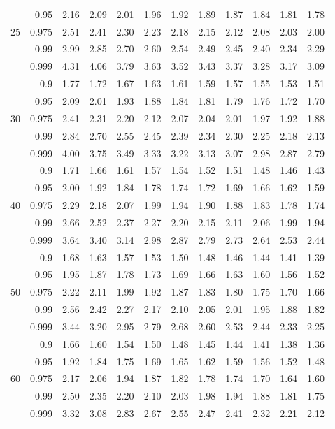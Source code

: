 \documentclass[12pt,a4paper,openany,twoside]{report}
\theoremstyle{definition}
\theoremstyle{remark}
\theoremstyle{plain}
\theoremstyle{definition}
\theoremstyle{definition}
\theoremstyle{definition}
\theoremstyle{remark}
\begin{document}
\begin{center}
\begin{tabular}{rr@{\ \ }r@{\ \ }r@{\ \ }r@{\ \ }r@{\ \ }r@{\ \ }r@{\ \ }r@{\ \ }r@{\ \ }r@{\ \ }r@{ }}
 & 0.95 & 2.16 & 2.09 & 2.01 & 1.96 & 1.92 & 1.89 & 1.87 & 1.84 & 1.81 & 1.78\\
25 & 0.975 & 2.51 & 2.41 & 2.30 & 2.23 & 2.18 & 2.15 & 2.12 & 2.08 & 2.03 & 2.00\\
 & 0.99 & 2.99 & 2.85 & 2.70 & 2.60 & 2.54 & 2.49 & 2.45 & 2.40 & 2.34 & 2.29\\
 & 0.999 & 4.31 & 4.06 & 3.79 & 3.63 & 3.52 & 3.43 & 3.37 & 3.28 & 3.17 & 3.09\\
\rule{0pt}{2.5ex} & 0.9 & 1.77 & 1.72 & 1.67 & 1.63 & 1.61 & 1.59 & 1.57 & 1.55 & 1.53 & 1.51\\
 & 0.95 & 2.09 & 2.01 & 1.93 & 1.88 & 1.84 & 1.81 & 1.79 & 1.76 & 1.72 & 1.70\\
30 & 0.975 & 2.41 & 2.31 & 2.20 & 2.12 & 2.07 & 2.04 & 2.01 & 1.97 & 1.92 & 1.88\\
 & 0.99 & 2.84 & 2.70 & 2.55 & 2.45 & 2.39 & 2.34 & 2.30 & 2.25 & 2.18 & 2.13\\
 & 0.999 & 4.00 & 3.75 & 3.49 & 3.33 & 3.22 & 3.13 & 3.07 & 2.98 & 2.87 & 2.79\\
\rule{0pt}{2.5ex} & 0.9 & 1.71 & 1.66 & 1.61 & 1.57 & 1.54 & 1.52 & 1.51 & 1.48 & 1.46 & 1.43\\
 & 0.95 & 2.00 & 1.92 & 1.84 & 1.78 & 1.74 & 1.72 & 1.69 & 1.66 & 1.62 & 1.59\\
40 & 0.975 & 2.29 & 2.18 & 2.07 & 1.99 & 1.94 & 1.90 & 1.88 & 1.83 & 1.78 & 1.74\\
 & 0.99 & 2.66 & 2.52 & 2.37 & 2.27 & 2.20 & 2.15 & 2.11 & 2.06 & 1.99 & 1.94\\
 & 0.999 & 3.64 & 3.40 & 3.14 & 2.98 & 2.87 & 2.79 & 2.73 & 2.64 & 2.53 & 2.44\\
\rule{0pt}{2.5ex} & 0.9 & 1.68 & 1.63 & 1.57 & 1.53 & 1.50 & 1.48 & 1.46 & 1.44 & 1.41 & 1.39\\
 & 0.95 & 1.95 & 1.87 & 1.78 & 1.73 & 1.69 & 1.66 & 1.63 & 1.60 & 1.56 & 1.52\\
50 & 0.975 & 2.22 & 2.11 & 1.99 & 1.92 & 1.87 & 1.83 & 1.80 & 1.75 & 1.70 & 1.66\\
 & 0.99 & 2.56 & 2.42 & 2.27 & 2.17 & 2.10 & 2.05 & 2.01 & 1.95 & 1.88 & 1.82\\
 & 0.999 & 3.44 & 3.20 & 2.95 & 2.79 & 2.68 & 2.60 & 2.53 & 2.44 & 2.33 & 2.25\\
\rule{0pt}{2.5ex} & 0.9 & 1.66 & 1.60 & 1.54 & 1.50 & 1.48 & 1.45 & 1.44 & 1.41 & 1.38 & 1.36\\
 & 0.95 & 1.92 & 1.84 & 1.75 & 1.69 & 1.65 & 1.62 & 1.59 & 1.56 & 1.52 & 1.48\\
60 & 0.975 & 2.17 & 2.06 & 1.94 & 1.87 & 1.82 & 1.78 & 1.74 & 1.70 & 1.64 & 1.60\\
 & 0.99 & 2.50 & 2.35 & 2.20 & 2.10 & 2.03 & 1.98 & 1.94 & 1.88 & 1.81 & 1.75\\
 & 0.999 & 3.32 & 3.08 & 2.83 & 2.67 & 2.55 & 2.47 & 2.41 & 2.32 & 2.21 & 2.12\\
\end{tabular}
\end{center}
\end{document}
